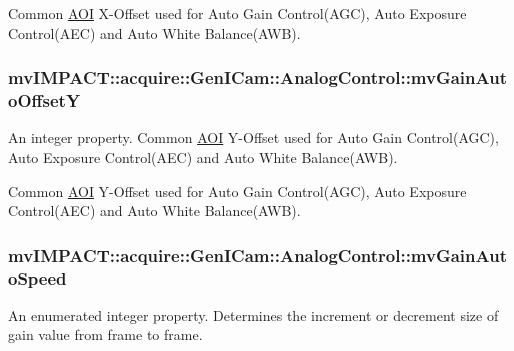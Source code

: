 Common \hyperlink{struct_a_o_i}{A\+O\+I} X-\/\+Offset used for Auto Gain Control(\+A\+G\+C), Auto Exposure Control(\+A\+E\+C) and Auto White Balance(\+A\+W\+B). \hypertarget{classmv_i_m_p_a_c_t_1_1acquire_1_1_gen_i_cam_1_1_analog_control_ae532c8e928fd540e2429fbf4de09670a}{
\subsubsection[{mv\+Gain\+Auto\+Offset\+Y}]{ mv\+I\+M\+P\+A\+C\+T\+::acquire\+::\+Gen\+I\+Cam\+::\+Analog\+Control\+::mv\+Gain\+Auto\+Offset\+Y}}\label{classmv_i_m_p_a_c_t_1_1acquire_1_1_gen_i_cam_1_1_analog_control_ae532c8e928fd540e2429fbf4de09670a}


An integer property. Common \hyperlink{struct_a_o_i}{A\+O\+I} Y-\/\+Offset used for Auto Gain Control(\+A\+G\+C), Auto Exposure Control(\+A\+E\+C) and Auto White Balance(\+A\+W\+B). 

Common \hyperlink{struct_a_o_i}{A\+O\+I} Y-\/\+Offset used for Auto Gain Control(\+A\+G\+C), Auto Exposure Control(\+A\+E\+C) and Auto White Balance(\+A\+W\+B). \hypertarget{classmv_i_m_p_a_c_t_1_1acquire_1_1_gen_i_cam_1_1_analog_control_a019e7f6318bde08ea5566e57a432dd16}{
\subsubsection[{mv\+Gain\+Auto\+Speed}]{ mv\+I\+M\+P\+A\+C\+T\+::acquire\+::\+Gen\+I\+Cam\+::\+Analog\+Control\+::mv\+Gain\+Auto\+Speed}}\label{classmv_i_m_p_a_c_t_1_1acquire_1_1_gen_i_cam_1_1_analog_control_a019e7f6318bde08ea5566e57a432dd16}


An enumerated integer property. Determines the increment or decrement size of gain value from frame to frame. 

